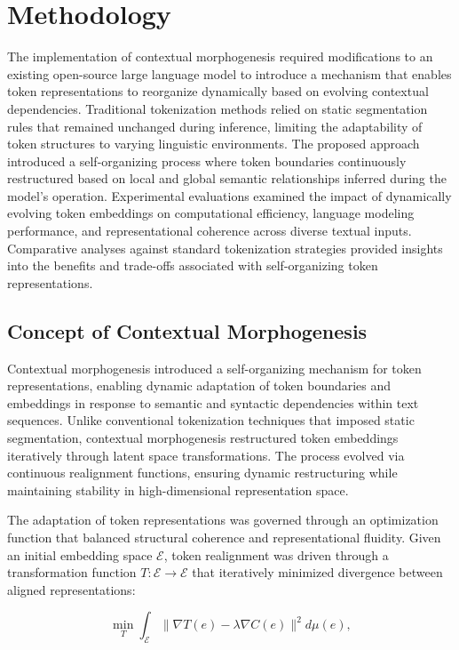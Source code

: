 \documentclass{article}
\begin{document}
\section{Methodology}

The implementation of contextual morphogenesis required modifications to an existing open-source large language model to introduce a mechanism that enables token representations to reorganize dynamically based on evolving contextual dependencies. Traditional tokenization methods relied on static segmentation rules that remained unchanged during inference, limiting the adaptability of token structures to varying linguistic environments. The proposed approach introduced a self-organizing process where token boundaries continuously restructured based on local and global semantic relationships inferred during the model’s operation. Experimental evaluations examined the impact of dynamically evolving token embeddings on computational efficiency, language modeling performance, and representational coherence across diverse textual inputs. Comparative analyses against standard tokenization strategies provided insights into the benefits and trade-offs associated with self-organizing token representations. 

\subsection{Concept of Contextual Morphogenesis}

Contextual morphogenesis introduced a self-organizing mechanism for token representations, enabling dynamic adaptation of token boundaries and embeddings in response to semantic and syntactic dependencies within text sequences. Unlike conventional tokenization techniques that imposed static segmentation, contextual morphogenesis restructured token embeddings iteratively through latent space transformations. The process evolved via continuous realignment functions, ensuring dynamic restructuring while maintaining stability in high-dimensional representation space.

The adaptation of token representations was governed through an optimization function that balanced structural coherence and representational fluidity. Given an initial embedding space $\mathcal{E}$, token realignment was driven through a transformation function $T: \mathcal{E} \to \mathcal{E}$ that iteratively minimized divergence between aligned representations:

\begin{equation}
	\min_{T} \int_{\mathcal{E}} \|\nabla T(e) - \lambda \nabla C(e)\|^2 d\mu(e),
\end{equation}
\end{document}
